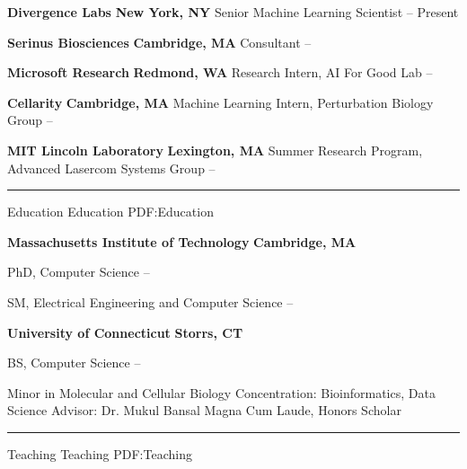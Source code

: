 \documentclass[letterpaper,MMMyyyy,nonstopmode]{simpleresumecv}
\begin{document}
\begin{Body}
\Entry
{\textbf{Divergence Labs}}
\hfill \textbf{New York, NY}
\Gap
\Item Senior Machine Learning Scientist
\hfill
{} -- Present
\BigGap

\Entry
{\textbf{Serinus Biosciences}}
\hfill \textbf{Cambridge, MA}
\Gap
\Item Consultant
\hfill
{} -- 
\BigGap

\Entry
{\textbf{Microsoft Research}}
\hfill \textbf{Redmond, WA}
\Gap
\Item Research Intern, AI For Good Lab
\hfill
{} -- 
\BigGap

\Entry
{\textbf{Cellarity}}
\hfill \textbf{Cambridge, MA}
\Gap
\Item Machine Learning Intern, Perturbation Biology Group
\hfill
{} -- 
\BigGap

\Entry
{\textbf{MIT Lincoln Laboratory}}
\hfill \textbf{Lexington, MA}
\Gap
\Item Summer Research Program, Advanced Lasercom Systems Group
\hfill
{} --
\BigGap

\BigGap
\hrule
\Section
{Education}
{Education}
{PDF:Education}

\Entry
\textbf{Massachusetts Institute of Technology}
\hfill \textbf{Cambridge, MA}

\Gap
\Item PhD, Computer Science
\hfill
{} --
\Gap
\begin{Detail}
\end{Detail}
\Gap

\Item SM, Electrical Engineering and Computer Science
\hfill
{} --
\BigGap

\Entry
\textbf{University of Connecticut}
\hfill \textbf{Storrs, CT}

\Gap
\Item BS, Computer Science
\hfill
{} --
\Gap
\begin{Detail}
\SubBulletItem Minor in Molecular and Cellular Biology
\SubBulletItem Concentration: Bioinformatics, Data Science
\SubBulletItem Advisor: Dr. Mukul Bansal
\SubBulletItem Magna Cum Laude, Honors Scholar
\end{Detail}


\BigGap
\hrule
\Section
{Teaching}
{Teaching}
{PDF:Teaching}


\end{Body}
\end{document}
